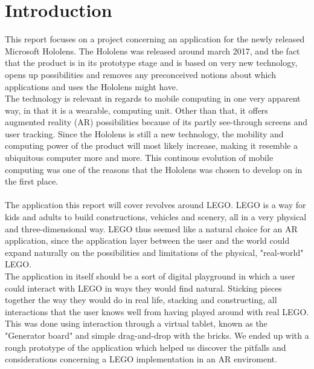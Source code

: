 
\section{Introduction}
This report focuses on a project concerning an application for the newly released Microsoft Hololens. The Hololens was released around march 2017, and the fact that the product is in its prototype stage and is based on very new technology, opens up possibilities and removes any preconceived notions about which applications and uses the Hololens might have.\\
The technology is relevant in regards to mobile computing in one very apparent way, in that it is a wearable, computing unit. Other than that, it offers augmented reality (AR) possibilities because of its partly see-through screens and user tracking. Since the Hololens is still a new technology, the mobility and computing power of the product will most likely increase, making it resemble a ubiquitous computer more and more. This continous evolution of mobile computing was one of the reasons that the Hololens was chosen to develop on in the first place.\\\\
The application this report will cover revolves around LEGO. LEGO is a way for kids and adults to build constructions, vehicles and scenery, all in a very physical and three-dimensional way. LEGO thus seemed like a natural choice for an AR application, since the application layer between the user and the world could expand naturally on the possibilities and limitations of the physical, "real-world" LEGO.\\
The application in itself should be a sort of digital playground in which a user could interact with LEGO in ways they would find natural. Sticking pieces together the way they would do in real life, stacking and constructing, all interactions that the user knows well from having played around with real LEGO. This was done using interaction through a virtual tablet, known as the "Generator board" and simple drag-and-drop with the bricks. We ended up with a rough prototype of the application which helped us discover the pitfalls and considerations concerning a LEGO implementation in an AR enviroment.